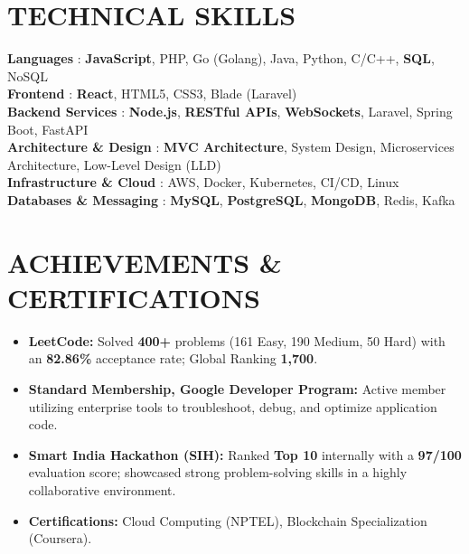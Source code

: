 \documentclass[letterpaper,11pt]{article}
\newcommand{\resumeItem}[1]{\item\small{{#1 \vspace{-1pt}}}}
\newcommand{\resumeItemListStart}{\begin{itemize}}
\newcommand{\resumeItemListEnd}{\end{itemize}\vspace{0pt}}
\begin{document}
\section{TECHNICAL SKILLS}
 \begin{itemize}[leftmargin=0in, label={}]
    \small{\item{
     \textbf{Languages} {: \textbf{JavaScript}, PHP, Go (Golang), Java, Python, C/C++, \textbf{SQL}, NoSQL}\vspace{2pt} \\
     \textbf{Frontend} {: \textbf{React}, HTML5, CSS3, Blade (Laravel)}\vspace{2pt} \\
     \textbf{Backend Services} {: \textbf{Node.js}, \textbf{RESTful APIs}, \textbf{WebSockets}, Laravel, Spring Boot, FastAPI}\vspace{2pt} \\
     \textbf{Architecture \& Design} {: \textbf{MVC Architecture}, System Design, Microservices Architecture, Low-Level Design (LLD)}\vspace{2pt} \\
     \textbf{Infrastructure \& Cloud} {: AWS, Docker, Kubernetes, CI/CD, Linux}\vspace{2pt} \\
     \textbf{Databases \& Messaging} {: \textbf{MySQL}, \textbf{PostgreSQL}, \textbf{MongoDB}, Redis, Kafka}
    }}
 \end{itemize}

\section{ACHIEVEMENTS \& CERTIFICATIONS}
    \resumeItemListStart
        \resumeItem{\textbf{LeetCode:} Solved \textbf{400+} problems (161 Easy, 190 Medium, 50 Hard) with an \textbf{82.86\%} acceptance rate; Global Ranking \textbf{1,700}.}
        \resumeItem{\textbf{Standard Membership, Google Developer Program:} Active member utilizing enterprise tools to troubleshoot, debug, and optimize application code.}
        \resumeItem{\textbf{Smart India Hackathon (SIH):} Ranked \textbf{Top 10} internally with a \textbf{97/100} evaluation score; showcased strong problem-solving skills in a highly collaborative environment.}
        \resumeItem{\textbf{Certifications:} Cloud Computing (NPTEL), Blockchain Specialization (Coursera).}
    \resumeItemListEnd
\end{document}
